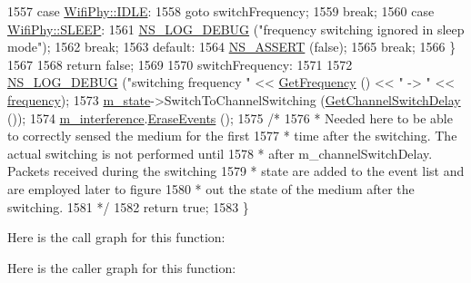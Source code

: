 \begin{DoxyCode}
1557     \textcolor{keywordflow}{case} \hyperlink{classns3_1_1WifiPhy_af97408fa76f99797497b492758467143ab82b721cfd612ae187d78ffc812c567d}{WifiPhy::IDLE}:
1558       \textcolor{keywordflow}{goto} switchFrequency;
1559       \textcolor{keywordflow}{break};
1560     \textcolor{keywordflow}{case} \hyperlink{classns3_1_1WifiPhy_af97408fa76f99797497b492758467143ad77ab37fb7a2710222a92a3b81d23b65}{WifiPhy::SLEEP}:
1561       \hyperlink{group__logging_ga413f1886406d49f59a6a0a89b77b4d0a}{NS\_LOG\_DEBUG} (\textcolor{stringliteral}{"frequency switching ignored in sleep mode"});
1562       \textcolor{keywordflow}{break};
1563     \textcolor{keywordflow}{default}:
1564       \hyperlink{assert_8h_a6dccdb0de9b252f60088ce281c49d052}{NS\_ASSERT} (\textcolor{keyword}{false});
1565       \textcolor{keywordflow}{break};
1566     \}
1567 
1568   \textcolor{keywordflow}{return} \textcolor{keyword}{false};
1569 
1570 switchFrequency:
1571 
1572   \hyperlink{group__logging_ga413f1886406d49f59a6a0a89b77b4d0a}{NS\_LOG\_DEBUG} (\textcolor{stringliteral}{"switching frequency "} << \hyperlink{classns3_1_1WifiPhy_ad2508d94faf22d690d6b8b4367934fd1}{GetFrequency} () << \textcolor{stringliteral}{" -> "} << 
      \hyperlink{lte_2model_2fading-traces_2fading__trace__generator_8m_a09045328d6d7e16aa4013f526cc6993d}{frequency});
1573   \hyperlink{classns3_1_1WifiPhy_a020dae8902d858e3d121aa7a67ca2528}{m\_state}->SwitchToChannelSwitching (\hyperlink{classns3_1_1WifiPhy_a87aceab44ed843359bdaab5ea8cf4ad3}{GetChannelSwitchDelay} ());
1574   \hyperlink{classns3_1_1WifiPhy_a55909109ad2e2759702336770fa90119}{m\_interference}.\hyperlink{classns3_1_1InterferenceHelper_a30aa5b4b44ef28dd034c124b32dd8ed1}{EraseEvents} ();
1575   \textcolor{comment}{/*}
1576 \textcolor{comment}{   * Needed here to be able to correctly sensed the medium for the first}
1577 \textcolor{comment}{   * time after the switching. The actual switching is not performed until}
1578 \textcolor{comment}{   * after m\_channelSwitchDelay. Packets received during the switching}
1579 \textcolor{comment}{   * state are added to the event list and are employed later to figure}
1580 \textcolor{comment}{   * out the state of the medium after the switching.}
1581 \textcolor{comment}{   */}
1582   \textcolor{keywordflow}{return} \textcolor{keyword}{true};
1583 \}
\end{DoxyCode}


Here is the call graph for this function\+:




Here is the caller graph for this function\+:



